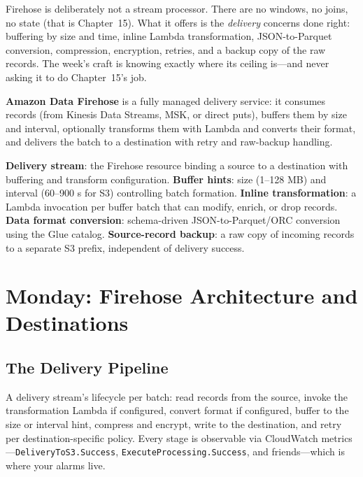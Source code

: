 Firehose is deliberately not a stream processor. There are no windows, no joins, no state (that is Chapter~15). What it offers is the \emph{delivery} concerns done right: buffering by size and time, inline Lambda transformation, JSON-to-Parquet conversion, compression, encryption, retries, and a backup copy of the raw records. The week's craft is knowing exactly where its ceiling is---and never asking it to do Chapter~15's job.

\begin{definitionbox}
\textbf{Amazon Data Firehose} is a fully managed delivery service: it consumes records (from Kinesis Data Streams, MSK, or direct puts), buffers them by size and interval, optionally transforms them with Lambda and converts their format, and delivers the batch to a destination with retry and raw-backup handling.
\end{definitionbox}

\begin{keyterms}
\textbf{Delivery stream}: the Firehose resource binding a source to a destination with buffering and transform configuration. \textbf{Buffer hints}: size (1--128 MB) and interval (60--900 s for S3) controlling batch formation. \textbf{Inline transformation}: a Lambda invocation per buffer batch that can modify, enrich, or drop records. \textbf{Data format conversion}: schema-driven JSON-to-Parquet/ORC conversion using the Glue catalog. \textbf{Source-record backup}: a raw copy of incoming records to a separate S3 prefix, independent of delivery success.
\end{keyterms}

\section{Monday: Firehose Architecture and Destinations}
\subsection{The Delivery Pipeline}
A delivery stream's lifecycle per batch: read records from the source, invoke the transformation Lambda if configured, convert format if configured, buffer to the size or interval hint, compress and encrypt, write to the destination, and retry per destination-specific policy. Every stage is observable via CloudWatch metrics---\texttt{DeliveryToS3.Success}, \texttt{ExecuteProcessing.Success}, and friends---which is where your alarms live.

